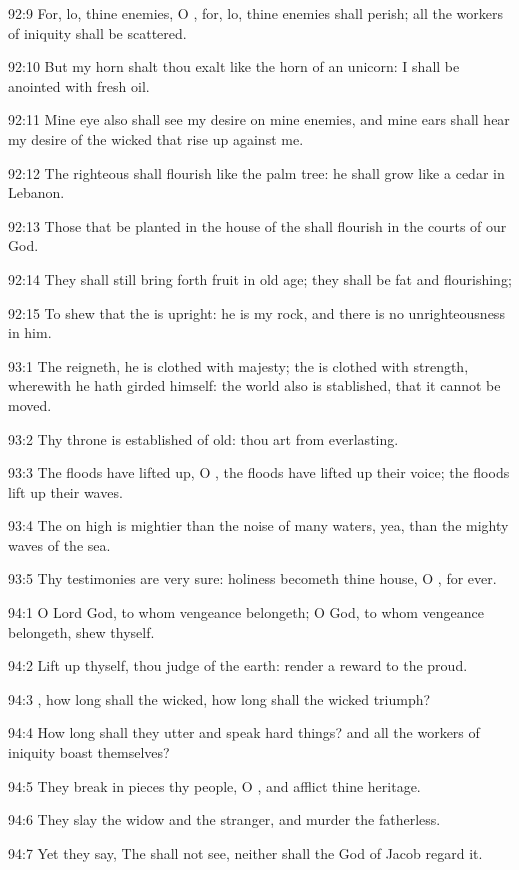 92:9 For, lo, thine enemies, O \LORD, for, lo, thine enemies shall perish; all the workers of iniquity shall be scattered.

92:10 But my horn shalt thou exalt like the horn of an unicorn: I shall be anointed with fresh oil.

92:11 Mine eye also shall see my desire on mine enemies, and mine ears shall hear my desire of the wicked that rise up against me.

92:12 The righteous shall flourish like the palm tree: he shall grow like a cedar in Lebanon.

92:13 Those that be planted in the house of the \LORD shall flourish in the courts of our God.

92:14 They shall still bring forth fruit in old age; they shall be fat and flourishing;

92:15 To shew that the \LORD is upright: he is my rock, and there is no unrighteousness in him.



93:1 The \LORD reigneth, he is clothed with majesty; the \LORD is clothed with strength, wherewith he hath girded himself: the world also is stablished, that it cannot be moved.

93:2 Thy throne is established of old: thou art from everlasting.

93:3 The floods have lifted up, O \LORD, the floods have lifted up their voice; the floods lift up their waves.

93:4 The \LORD on high is mightier than the noise of many waters, yea, than the mighty waves of the sea.

93:5 Thy testimonies are very sure: holiness becometh thine house, O \LORD, for ever.



94:1 O Lord God, to whom vengeance belongeth; O God, to whom vengeance belongeth, shew thyself.

94:2 Lift up thyself, thou judge of the earth: render a reward to the proud.

94:3 \LORD, how long shall the wicked, how long shall the wicked triumph?

94:4 How long shall they utter and speak hard things? and all the workers of iniquity boast themselves?

94:5 They break in pieces thy people, O \LORD, and afflict thine heritage.

94:6 They slay the widow and the stranger, and murder the fatherless.

94:7 Yet they say, The \LORD shall not see, neither shall the God of Jacob regard it.

